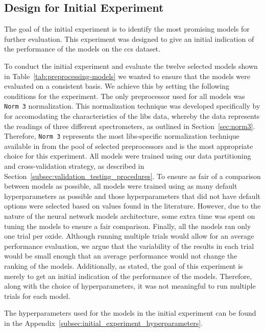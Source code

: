 \subsection{Design for Initial Experiment}\label{sec:initial-experiment}
The goal of the initial experiment is to identify the most promising models for further evaluation.
This experiment was designed to give an initial indication of the performance of the models on the \gls{ccs} dataset.

To conduct the initial experiment and evaluate the twelve selected models shown in Table~\ref{tab:preprocessing-models} we wanted to ensure that the models were evaluated on a consistent basis.
We achieve this by setting the following conditions for the experiment.
The only preprocessor used for all models was \texttt{Norm 3} normalization.
This normalization technique was developed specifically by \citet{cleggRecalibrationMarsScience2017} for accomodating the characteristics of the \gls{libs} data, whereby the data represents the readings of three different spectrometers, as outlined in Section~\ref{sec:norm3}.
Therefore, \texttt{Norm 3} represents the most \gls{libs}-specific normalization technique available in from the pool of selected preprocessors and is the most appropriate choice for this experiment.
All models were trained using our data partitioning and cross-validation strategy, as described in Section~\ref{subsec:validation_testing_procedures}. 
To ensure as fair of a comparison between models as possible, all models were trained using as many default hyperparameters as possible and those hyperparameters that did not have default options were selected based on values found in the literature.
However, due to the nature of the neural network models architecture, some extra time was spent on tuning the models to ensure a fair comparison.
Finally, all the models ran only one trial per oxide. 
Although running multiple trials would allow for an average performance evaluation, we argue that the variability of the results in each trial would be small enough that an average performance would not change the ranking of the models. 
Additionally, as stated, the goal of this experiment is merely to get an initial indication of the performance of the models.
Therefore, along with the choice of hyperparameters, it was not meaningful to run multiple trials for each model.

The hyperparameters used for the models in the initial experiment can be found in the Appendix~\ref{subsec:initial_experiment_hyperparameters}.